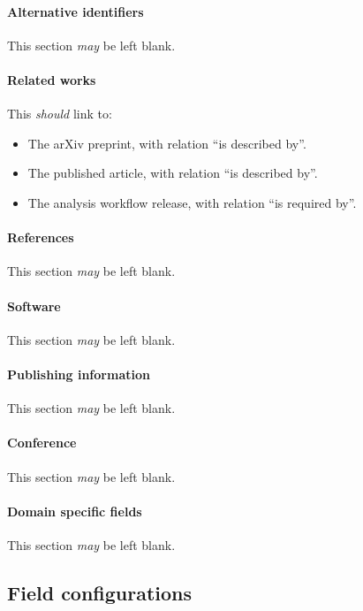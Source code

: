 \documentclass{article}
\newcommand\rfcword[1]{\emph{#1}\xspace}
\newcommand\should{\rfcword{should}}
\newcommand\may{\rfcword{may}}
\begin{document}
\paragraph{Alternative identifiers}

This section \may be left blank.

\paragraph{Related works}

This \should link to:
\begin{itemize}
  \item
        The arXiv preprint,
        with relation ``is described by''.
  \item
        The published article,
        with relation ``is described by''.
  \item
        The analysis workflow release,
        with relation ``is required by''.
\end{itemize}

\paragraph{References}

This section \may be left blank.

\paragraph{Software}

This section \may be left blank.

\paragraph{Publishing information}

This section \may be left blank.

\paragraph{Conference}

This section \may be left blank.

\paragraph{Domain specific fields}

This section \may be left blank.


\subsection{Field configurations}
\end{document}
